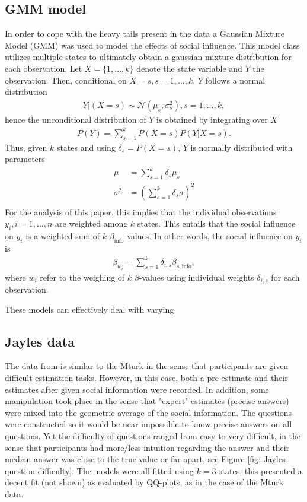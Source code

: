 \documentclass[9pt,twoside,lineno]{pnas-new}
\begin{document}
\subsection*{GMM model}
In order to cope with the heavy tails present in the data a Gaussian Mixture Model (GMM) was used to model the effects of social influence. This model class utilizes multiple states to ultimately obtain a gaussian mixture distribution for each observation. Let $X=\{1,\dots,k\}$ denote the state variable and $Y$ the observation. Then, conditional on $X=s, s=1,\dots,k$, $Y$ follows a normal distribution
\begin{align*}
	Y|(X=s)  \sim \mathcal{N} (\mu_s,\sigma^2_s), s=1,\dots,k,
\end{align*}
hence the unconditional distribution of $Y$ is obtained by integrating over $X$
\begin{align*}
	P(Y) = \sum_{s=1}^k P(X=s)P(Y|X=s).
\end{align*}
Thus, given $k$ states and using $\delta_s = P(X=s)$, $Y$ is normally distributed with parameters
\begin{align*}
	\mu &= \sum_{s=1}^k \delta_s \mu_s \\
	\sigma^2 &= \left(\sum_{s=1}^k \delta_s \sigma\right)^2 \\
\end{align*}
For the analysis of this paper, this implies that the individual observations $y_i, i=1,\dots,n$ are weighted among $k$ states. This entails that the social influence on $y_i$ is a weighted sum of $k$ $\beta_\text{info}$ values. In other words, the social influence on $y_i$ is
\begin{align*}
	\beta_{w_i}	 = \sum_{s=1}^k \delta_{i,s}\beta_{s,\text{info}},
\end{align*}
where $w_i$ refer to the weighing of $k$ $\beta$-values using individual weights $\delta_{i,s}$ for each observation.

These models can effectively deal with varying 
 



\subsection*{Jayles data}
The data from \citep{jayles2017social} is similar to the Mturk in the sense that participants are given difficult estimation tasks. However, in this case, both a pre-estimate and their estimates after given social information were recorded. In addition, some manipulation took place in the sense that "expert" estimates (precise answers) were mixed into the geometric average of the social information. The questions were constructed so it would be near impossible to know precise answers on all questions. Yet the difficulty of questions ranged from easy to very difficult, in the sense that participants had more/less intuition regarding the answer and their median answer was close to the true value or far apart, see Figure \ref{fig: Jayles question difficulty}. The models were all fitted using $k=3$ states, this presented a decent fit (not shown) as evaluated by QQ-plots, as in the case of the Mturk data. 
\end{document}
